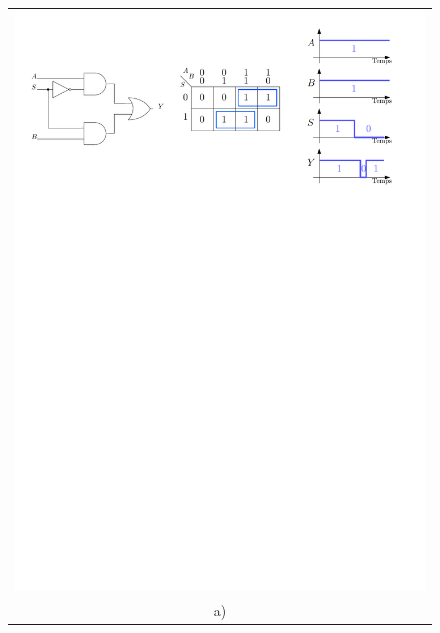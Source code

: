 \begin{figure}[htbp]
\centering\begin{tabular}{c}
\includegraphics[width=\linewidth]{Figs/and_2e_mux1.pdf}\\
a)\\

\end{tabular}
\end{figure}
